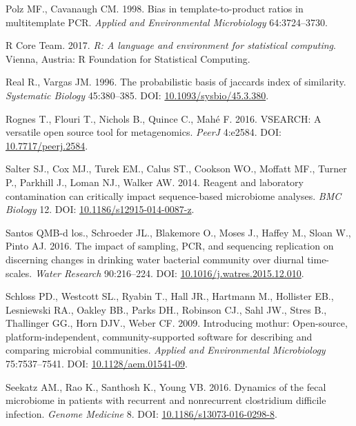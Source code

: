 \documentclass[11pt,]{article}
\begin{document}
\hypertarget{ref-polz_bias_1998}{}
Polz MF., Cavanaugh CM. 1998. Bias in template-to-product ratios in
multitemplate PCR. \emph{Applied and Environmental Microbiology}
64:3724--3730.

\hypertarget{ref-r_citation_2017}{}
R Core Team. 2017. \emph{R: A language and environment for statistical
computing}. Vienna, Austria: R Foundation for Statistical Computing.

\hypertarget{ref-Real1996}{}
Real R., Vargas JM. 1996. The probabilistic basis of jaccards index of
similarity. \emph{Systematic Biology} 45:380--385. DOI:
\href{https://doi.org/10.1093/sysbio/45.3.380}{10.1093/sysbio/45.3.380}.

\hypertarget{ref-vsearch_Rognes_2016}{}
Rognes T., Flouri T., Nichols B., Quince C., Mahé F. 2016. VSEARCH: A
versatile open source tool for metagenomics. \emph{PeerJ} 4:e2584. DOI:
\href{https://doi.org/10.7717/peerj.2584}{10.7717/peerj.2584}.

\hypertarget{ref-contamination_Salter2014}{}
Salter SJ., Cox MJ., Turek EM., Calus ST., Cookson WO., Moffatt MF.,
Turner P., Parkhill J., Loman NJ., Walker AW. 2014. Reagent and
laboratory contamination can critically impact sequence-based microbiome
analyses. \emph{BMC Biology} 12. DOI:
\href{https://doi.org/10.1186/s12915-014-0087-z}{10.1186/s12915-014-0087-z}.

\hypertarget{ref-BautistadelosSantos2016}{}
Santos QMB-d los., Schroeder JL., Blakemore O., Moses J., Haffey M.,
Sloan W., Pinto AJ. 2016. The impact of sampling, PCR, and sequencing
replication on discerning changes in drinking water bacterial community
over diurnal time-scales. \emph{Water Research} 90:216--224. DOI:
\href{https://doi.org/10.1016/j.watres.2015.12.010}{10.1016/j.watres.2015.12.010}.

\hypertarget{ref-mothur_schloss_2009}{}
Schloss PD., Westcott SL., Ryabin T., Hall JR., Hartmann M., Hollister
EB., Lesniewski RA., Oakley BB., Parks DH., Robinson CJ., Sahl JW.,
Stres B., Thallinger GG., Horn DJV., Weber CF. 2009. Introducing mothur:
Open-source, platform-independent, community-supported software for
describing and comparing microbial communities. \emph{Applied and
Environmental Microbiology} 75:7537--7541. DOI:
\href{https://doi.org/10.1128/aem.01541-09}{10.1128/aem.01541-09}.

\hypertarget{ref-erin_seekatz_2016}{}
Seekatz AM., Rao K., Santhosh K., Young VB. 2016. Dynamics of the fecal
microbiome in patients with recurrent and nonrecurrent clostridium
difficile infection. \emph{Genome Medicine} 8. DOI:
\href{https://doi.org/10.1186/s13073-016-0298-8}{10.1186/s13073-016-0298-8}.
\end{document}
